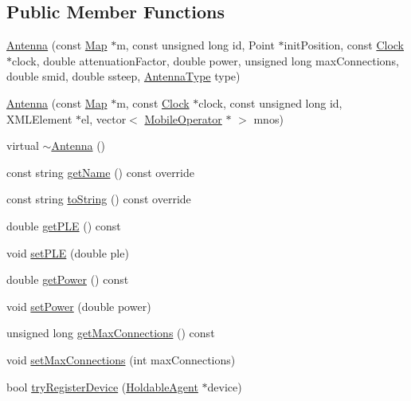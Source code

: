 \subsection*{Public Member Functions}
\begin{DoxyCompactItemize}
\item 
\mbox{\hyperlink{class_antenna_a39c505109145908a5b032a16a2fe53c4}{Antenna}} (const \mbox{\hyperlink{class_map}{Map}} $\ast$m, const unsigned long id, Point $\ast$init\+Position, const \mbox{\hyperlink{class_clock}{Clock}} $\ast$clock, double attenuation\+Factor, double power, unsigned long max\+Connections, double smid, double ssteep, \mbox{\hyperlink{_antenna_type_8h_a7b678b5cb9dedc607131200119d96b16}{Antenna\+Type}} type)
\item 
\mbox{\hyperlink{class_antenna_a7c534fa7ee1e288e9e6af489b24a7349}{Antenna}} (const \mbox{\hyperlink{class_map}{Map}} $\ast$m, const \mbox{\hyperlink{class_clock}{Clock}} $\ast$clock, const unsigned long id, X\+M\+L\+Element $\ast$el, vector$<$ \mbox{\hyperlink{class_mobile_operator}{Mobile\+Operator}} $\ast$ $>$ mnos)
\item 
virtual \mbox{\hyperlink{class_antenna_ad7b98073b970db5d6bc83c5c5961fe44}{$\sim$\+Antenna}} ()
\item 
const string \mbox{\hyperlink{class_antenna_a4ad9da1ca9d79f20b331c22b94c57a02}{get\+Name}} () const override
\item 
const string \mbox{\hyperlink{class_antenna_a7fea30e065f49a3cbcee02f60bd033c8}{to\+String}} () const override
\item 
double \mbox{\hyperlink{class_antenna_ab0c45eb94291446fc48c312854f8818d}{get\+P\+LE}} () const
\item 
void \mbox{\hyperlink{class_antenna_ac0724f137d8e0af08d30ce2d07e6aa87}{set\+P\+LE}} (double ple)
\item 
double \mbox{\hyperlink{class_antenna_afca01d00c8e393ee911f1e9240b51d2e}{get\+Power}} () const
\item 
void \mbox{\hyperlink{class_antenna_a172a4c7765dea045d6504f6e2cbe0f59}{set\+Power}} (double power)
\item 
unsigned long \mbox{\hyperlink{class_antenna_ac7d42215283cd7d4dc16d449f61af91d}{get\+Max\+Connections}} () const
\item 
void \mbox{\hyperlink{class_antenna_ad844ed8507afb83b74b804c2434a4e50}{set\+Max\+Connections}} (int max\+Connections)
\item 
bool \mbox{\hyperlink{class_antenna_a4455f5c804e1ea520dd849dc9fd7b0b4}{try\+Register\+Device}} (\mbox{\hyperlink{class_holdable_agent}{Holdable\+Agent}} $\ast$device)

\end{DoxyCompactItemize}

